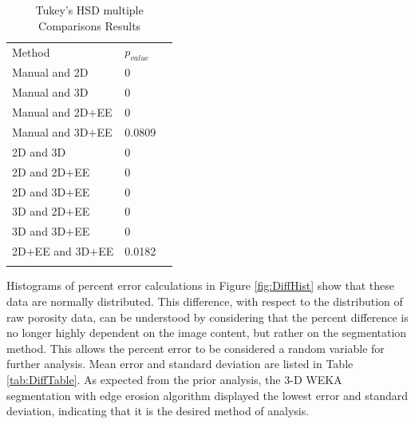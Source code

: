 \documentclass[11pt, twocolumn]{article}
\begin{document}
\begin{table}[htbp]
	\caption{Tukey's HSD multiple Comparisons Results}
	\label{tab:mult}       %
	\begin{tabular}{lll}
		\hline\noalign{\smallskip}
		Method & $p_{value}$ \\
		\noalign{\smallskip}\hline\noalign{\smallskip}
		Manual and 2D & 0 \\
		Manual and 3D & 0 \\
		Manual and 2D$+$EE & 0 \\
		Manual and 3D$+$EE & 0.0809 \\
		2D and 3D & 0 \\
		2D and 2D$+$EE & 0 \\
		2D and 3D$+$EE & 0 \\
		3D and 2D$+$EE & 0 \\
		3D and 3D$+$EE & 0 \\
		2D$+$EE and 3D$+$EE & 0.0182 \\
		\noalign{\smallskip}\hline
	\end{tabular}
	\centering
\end{table}

Histograms of percent error calculations in Figure \ref{fig:DiffHist} show that these data are normally distributed. This difference, with respect to the distribution of raw porosity data, can be understood by considering that the percent difference is no longer highly dependent on the image content, but rather on the segmentation method. This allows the percent error to be considered a random variable for further analysis. Mean error and standard deviation are listed in Table \ref{tab:DiffTable}. As expected from the prior analysis, the 3-D WEKA segmentation with edge erosion algorithm displayed the lowest error and standard deviation, indicating that it is the desired method of analysis. 
\end{document}
